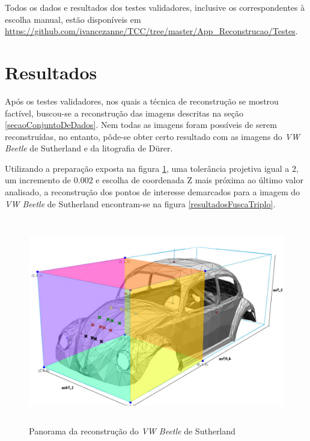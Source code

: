		Todos os dados e resultados dos testes validadores, inclusive os correspondentes à escolha manual, estão disponíveis em \url{https://github.com/ivancezanne/TCC/tree/master/App_Reconstrucao/Testes}.
		
		\section{Resultados}
			\label{secaoResultados}
			
			Após os testes validadores, nos quais a técnica de reconstrução se mostrou factível, buscou-se a reconstrução das imagens descritas na seção \ref{secaoConjuntoDeDados}. Nem todas as imagens foram possíveis de serem reconstruídas, no entanto, pôde-se obter certo resultado com as imagens do \textit{VW Beetle} de Sutherland e da litografia de Dürer.
			
			Utilizando a preparação exposta na figura \ref{printTesteFusca}, uma tolerância projetiva igual a $2$, um incremento de $0.002$ e escolha de coordenada Z mais próxima ao último valor analisado, a reconstrução dos pontos de interesse demarcados para a imagem do \textit{VW Beetle} de Sutherland encontram-se na figura \ref{resultadosFuscaTriplo}.
			
			\begin{figure}[!htb]
				\centering
				\includegraphics[height=9cm]{imagens/printTesteFusca.png}
				\caption{Panorama da reconstrução do \textit{VW Beetle} de Sutherland}
				\label{printTesteFusca}
			\end{figure}
			
